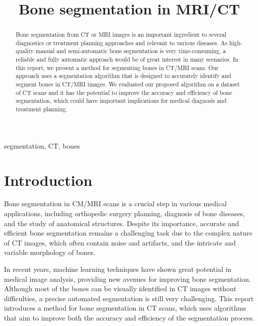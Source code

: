 \documentclass[conference]{IEEEtran}
\begin{document}
\title{Bone segmentation in MRI/CT\\}

\author{
\and
{}
\and
{}
}

\maketitle




\begin{abstract}
Bone segmentation from CT or MRI images is an important ingredient to several diagnostics or treatment planning approaches and relevant to various diseases. As high-quality manual and semi-automatic bone segmentation is very time-consuming, a reliable and fully automatic approach would be of great interest in many scenarios. In this report, we present a method for segmenting bones in CT/MRI scans. Our approach uses a segmentation algorithm that is designed to accurately identify and segment bones in CT/MRI images. We evaluated our proposed algorithm on a dataset of CT scans and it has the potential to improve the accuracy and efficiency of bone segmentation, which could have important implications for medical diagnosis and treatment planning.
\end{abstract}

\vspace{5mm}

\begin{IEEEkeywords}
 segmentation, CT, bones
\end{IEEEkeywords}
\section{Introduction}
Bone segmentation in CM/MRI scans is a crucial step in various medical applications, including orthopedic surgery planning, diagnosis of bone diseases, and the study of anatomical structures. Despite its importance, accurate and efficient bone segmentation remains a challenging task due to the complex nature of CT images, which often contain noise and artifacts, and the intricate and variable morphology of bones.

In recent years, machine learning techniques have shown great potential in medical image analysis, providing new avenues for improving bone segmentation. Although most of the bones can be visually identified in CT images without difficulties, a precise automated segmentation is still very challenging. This report introduces a method for bone segmentation in CT scans, which uses algorithms that aim to improve both the accuracy and efficiency of the segmentation process.
\end{document}
